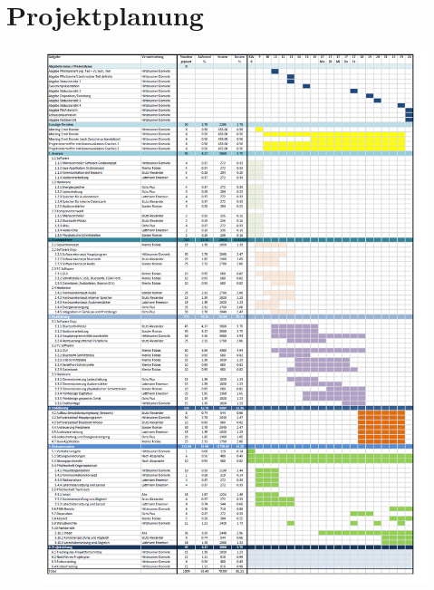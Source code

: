 \documentclass[10pt,a4paper,oneside]{99_fhnwreport}
\begin{document}
\newpage

\section{Projektplanung}\label{sec:projektplanung}




\begin{figure}[htbp]
	\centering
	\includegraphics[width=13.5cm]{projektplan.png}
\end{figure}
\newpage
\end{document}
